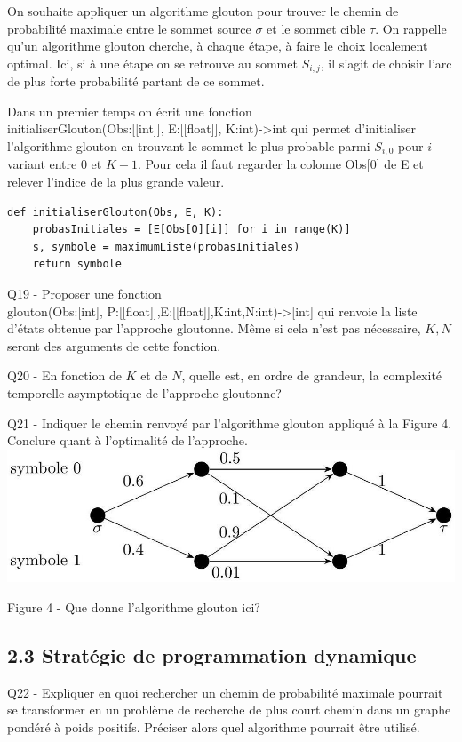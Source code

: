 \documentclass[10pt]{article}
\begin{document}
On souhaite appliquer un algorithme glouton pour trouver le chemin de probabilité maximale entre le sommet source $\sigma$ et le sommet cible $\tau$. On rappelle qu'un algorithme glouton cherche, à chaque étape, à faire le choix localement optimal. Ici, si à une étape on se retrouve au sommet $S_{i, j}$, il s'agit de choisir l'arc de plus forte probabilité partant de ce sommet.

Dans un premier temps on écrit une fonction\\[0pt]
initialiserGlouton(Obs:[[int]], E:[[float]], K:int)->int qui permet d'initialiser l'algorithme glouton en trouvant le sommet le plus probable parmi $S_{i, 0}$ pour $i$ variant entre 0 et $K-1$. Pour cela il faut regarder la colonne Obs[0] de E et relever l'indice de la plus grande valeur.

\begin{verbatim}
def initialiserGlouton(Obs, E, K):
    probasInitiales = [E[Obs[O][i]] for i in range(K)]
    s, symbole = maximumListe(probasInitiales)
    return symbole
\end{verbatim}

Q19 - Proposer une fonction\\[0pt]
glouton(Obs:[int], P:[[float]],E:[[float]],K:int,N:int)->[int] qui renvoie la liste d'états obtenue par l'approche gloutonne. Même si cela n'est pas nécessaire, $K, N$ seront des arguments de cette fonction.

Q20 - En fonction de $K$ et de $N$, quelle est, en ordre de grandeur, la complexité temporelle asymptotique de l'approche gloutonne?

Q21 - Indiquer le chemin renvoyé par l'algorithme glouton appliqué à la Figure 4. Conclure quant à l'optimalité de l'approche.\\
\includegraphics[max width=\textwidth, center]{2025_04_25_b5f58c3e8cc704f29fe4g-11}

Figure 4 - Que donne l'algorithme glouton ici?

\subsection*{2.3 Stratégie de programmation dynamique}
Q22 - Expliquer en quoi rechercher un chemin de probabilité maximale pourrait se transformer en un problème de recherche de plus court chemin dans un graphe pondéré à poids positifs. Préciser alors quel algorithme pourrait être utilisé.
\end{document}
